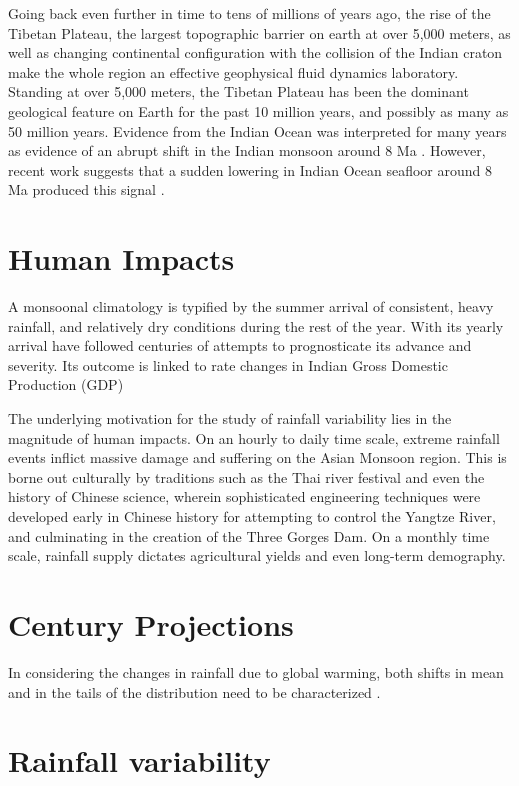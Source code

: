 	Going back even further in time to tens of millions of years ago, the rise of the Tibetan Plateau, the largest topographic barrier on earth at over 5,000 meters, as well as changing continental configuration with the collision of the Indian craton make the whole region an effective geophysical fluid dynamics laboratory. Standing at over 5,000 meters, the Tibetan Plateau has been the dominant geological feature on Earth for the past 10 million years, and possibly as many as 50 million years. Evidence from the Indian Ocean was interpreted for many years as evidence of an abrupt shift in the Indian monsoon around 8 Ma \citep{Harrison1992,Molnar1993}. However, recent work suggests that a sudden lowering in Indian Ocean seafloor around 8 Ma produced this signal \citep{Rodriguez2014}. 

\section{Human Impacts}

A monsoonal climatology is typified by the summer arrival of consistent, heavy rainfall, and relatively dry conditions during the rest of the year. With its yearly arrival have followed centuries of attempts to prognosticate its advance and severity. Its outcome is linked to rate changes in Indian Gross Domestic Production (GDP) \citep{Gadgil}

The underlying motivation for the study of rainfall variability lies in the magnitude of human impacts. On an hourly to daily time scale, extreme rainfall events inflict massive damage and suffering on the Asian Monsoon region. This is borne out culturally by traditions such as the Thai river festival and even the history of Chinese science, wherein sophisticated engineering techniques were developed early in Chinese history for attempting to control the Yangtze River, and culminating in the creation of the Three Gorges Dam. On a monthly time scale, rainfall supply dictates agricultural yields and even long-term demography. 

\section{ Century Projections}
In considering the changes in rainfall due to global warming, both shifts in mean and in the tails of the distribution need to be characterized \cite{Pendergrass}.


\section{Rainfall variability}

